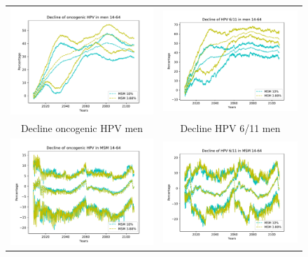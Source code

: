 \begin{figure}[!]
	\centering
	\begin{tabular}{cc}
		\includegraphics[width=0.5\linewidth]{IMGs/13.-Aumento_MSM/onco_hom.pdf}	& 
		\includegraphics[width=0.5\linewidth]{IMGs/13.-Aumento_MSM/verr_hom.pdf}  \\ 
		Decline oncogenic HPV men	& Decline HPV 6/11 men \\ 
		\includegraphics[width=0.5\linewidth]{IMGs/13.-Aumento_MSM/onco_MSM.pdf}	& 
		\includegraphics[width=0.5\linewidth]{IMGs/13.-Aumento_MSM/verr_MSM.pdf}  \\ 

\end{tabular}
\end{figure}
